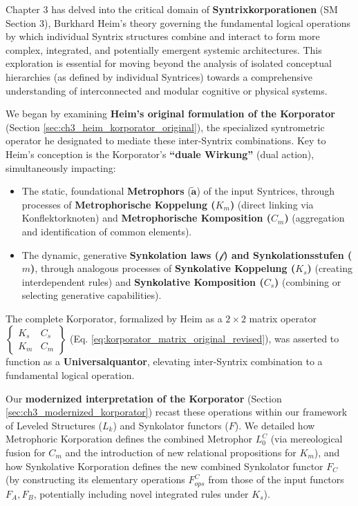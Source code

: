 \documentclass[
    12pt,              %
    a4paper,           %
    headings=normal,   %
    twoside=true,      %
    BCOR=8mm,          %
]{scrbook}
\newcommand{\q}[1]{\enquote{#1}}
\newcommand{\metrophor}{\bm{\widetilde{a}}}
\newcommand{\synkolator}{\mathcal{f}}
\newcommand{\synkolationsstufe}{m}
\newcommand{\korporatoroperator}{\begin{Bmatrix} K_s & C_s \\ K_m & C_m \end{Bmatrix}}
\begin{document}
Chapter 3 has delved into the critical domain of \textbf{Syntrixkorporationen} (SM Section 3), Burkhard Heim's theory governing the fundamental logical operations by which individual Syntrix structures combine and interact to form more complex, integrated, and potentially emergent systemic architectures. This exploration is essential for moving beyond the analysis of isolated conceptual hierarchies (as defined by individual Syntrices) towards a comprehensive understanding of interconnected and modular cognitive or physical systems.

We began by examining \textbf{Heim's original formulation of the Korporator} (Section \ref{sec:ch3_heim_korporator_original}), the specialized syntrometric operator he designated to mediate these inter-Syntrix combinations. Key to Heim's conception is the Korporator's \textbf{\q{duale Wirkung}} (dual action), simultaneously impacting:
\begin{itemize}
    \item   The static, foundational \textbf{Metrophors} (\(\metrophor\)) of the input Syntrices, through processes of \textbf{Metrophorische Koppelung (\(K_m\))} (direct linking via Konflektorknoten) and \textbf{Metrophorische Komposition (\(C_m\))} (aggregation and identification of common elements).
    \item   The dynamic, generative \textbf{Synkolation laws (\(\synkolator\)) and Synkolationsstufen (\(\synkolationsstufe\))}, through analogous processes of \textbf{Synkolative Koppelung (\(K_s\))} (creating interdependent rules) and \textbf{Synkolative Komposition (\(C_s\))} (combining or selecting generative capabilities).
\end{itemize}
The complete Korporator, formalized by Heim as a \(2 \times 2\) matrix operator \(\korporatoroperator\) (Eq. \eqref{eq:korporator_matrix_original_revised}), was asserted to function as a \textbf{Universalquantor}, elevating inter-Syntrix combination to a fundamental logical operation.

Our \textbf{modernized interpretation of the Korporator} (Section \ref{sec:ch3_modernized_korporator}) recast these operations within our framework of Leveled Structures (\(L_k\)) and Synkolator functors (\(F\)). We detailed how Metrophoric Korporation defines the combined Metrophor \(L_0^C\) (via mereological fusion for \(C_m\) and the introduction of new relational propositions for \(K_m\)), and how Synkolative Korporation defines the new combined Synkolator functor \(F_C\) (by constructing its elementary operations \(F_{ops}^C\) from those of the input functors \(F_A, F_B\), potentially including novel integrated rules under \(K_s\)).
\end{document}
